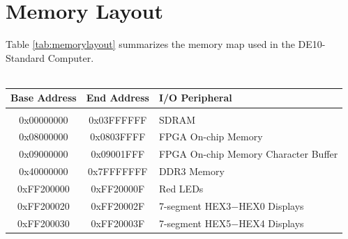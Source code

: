 \documentclass[11pt, twoside, pdftex]{article}
\newcommand{\systemName}{DE10-Standard Computer}
\begin{document}
\section{Memory Layout}

\noindent
Table \ref{tab:memorylayout} summarizes the memory map used in the \systemName.
~\\
~\\

\begin{table}[h]
    \begin{center}
    \begin{tabular}{c|c|l}
            \textbf{Base Address}
            & \textbf{End Address}
            & \textbf{I/O Peripheral}
				\\\hline\vspace{-3mm}\\
            0x00000000
            & 0x03FFFFFF
            & SDRAM
        \\
            0x08000000
            & 0x0803FFFF
            & FPGA On-chip Memory
        \\
            0x09000000
            & 0x09001FFF
            & FPGA On-chip Memory Character Buffer
        \\
            0x40000000
            & 0x7FFFFFFF
            & DDR3 Memory
        \\
            0xFF200000
            & 0xFF20000F
            & Red LEDs
        \\
            0xFF200020
            & 0xFF20002F
            & 7-segment HEX3$-$HEX0 Displays
        \\
            0xFF200030
            & 0xFF20003F
            & 7-segment HEX5$-$HEX4 Displays


\end{tabular}
\end{center}
\end{table}
\end{document}
